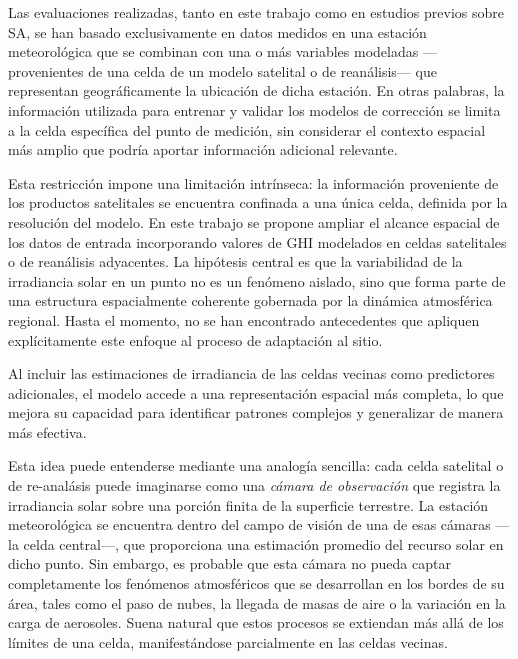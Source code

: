 \documentclass[letterpaper,12pt, twoside]{report}
\providecommand{\DIFdeltex}[1]{{\protect\color{red} \scriptsize #1}} %
\providecommand{\DIFdel}[1]{\texorpdfstring{\DIFdeltex{#1}}{}} %
\begin{document}
\DIFdel{Las evaluaciones realizadas, tanto en este trabajo como en estudios previos sobre SA, se han basado exclusivamente en datos medidos en una estación meteorológica que se combinan con una o más variables modeladas —provenientes de una celda de un modelo satelital o de reanálisis— que representan geográficamente la ubicación de dicha estación. En otras palabras, la información utilizada para entrenar y validar los modelos de corrección se limita a la celda específica del punto de medición, sin considerar el contexto espacial más amplio que podría aportar información adicional relevante.}%

\DIFdel{Esta restricción impone una limitación intrínseca: la información proveniente de los productos satelitales se encuentra confinada a una única celda, definida por la resolución del modelo. En este trabajo se propone ampliar el alcance espacial de los datos de entrada incorporando valores de GHI modelados en celdas satelitales o de reanálisis adyacentes. La hipótesis central es que la variabilidad de la irradiancia solar en un punto no es un fenómeno aislado, sino que forma parte de una estructura espacialmente coherente gobernada por la dinámica atmosférica regional. Hasta el momento, no se han encontrado antecedentes que apliquen explícitamente este enfoque al proceso de adaptación al sitio.}%

\DIFdel{Al incluir las estimaciones de irradiancia de las celdas vecinas como predictores adicionales, el modelo accede a una representación espacial más completa, lo que mejora su capacidad para identificar patrones complejos y generalizar de manera más efectiva.}%

\DIFdel{Esta idea puede entenderse mediante una analogía sencilla: cada celda satelital o de re-analásis puede imaginarse como una \emph{cámara de observación} que registra la irradiancia solar sobre una porción finita de la superficie terrestre. La estación meteorológica se encuentra dentro del campo de visión de una de esas cámaras —la celda central—, que proporciona una estimación promedio del recurso solar en dicho punto. Sin embargo, es probable que esta cámara no pueda captar completamente los fenómenos atmosféricos que se desarrollan en los bordes de su área, tales como el paso de nubes, la llegada de masas de aire o la variación en la carga de aerosoles. Suena natural que estos procesos se extiendan más allá de los límites de una celda, manifestándose parcialmente en las celdas vecinas.
}%
\end{document}
